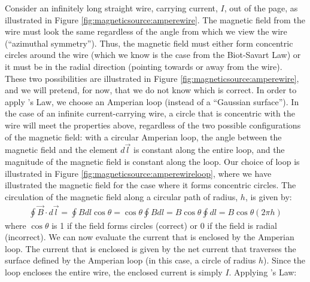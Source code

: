 Consider an infinitely long straight wire, carrying current, $I$, out of the page, as illustrated in Figure \ref{fig:magneticsource:amperewire}. The magnetic field from the wire must look the same regardless of the angle from which we view the wire (``azimuthal symmetry''). Thus, the magnetic field must either form concentric circles around the wire (which we know is the case from the Biot-Savart Law) or it must be in the radial direction (pointing towards or away from the wire). These two possibilities are illustrated in Figure \ref{fig:magneticsource:amperewire}, and we will pretend, for now, that we do not know which is correct.
In order to apply \ampere's Law, we choose an Amperian loop (instead of a ``Gaussian surface''). In the case of an infinite current-carrying wire, a circle that is concentric with the wire will meet the properties above, regardless of the two possible configurations of the magnetic field: with a circular Amperian loop, the angle between the magnetic field and the element $d\vec l$ is constant along the entire loop, and the magnitude of the magnetic field is constant along the loop. Our choice of loop is illustrated in Figure \ref{fig:magneticsource:amperewireloop}, where we have illustrated the magnetic field for the case where it forms concentric circles. 
The circulation of the magnetic field along a circular path of radius, $h$, is given by:
\begin{align*}
\oint  \vec B \cdot d\vec l = \oint B dl \cos\theta = \cos\theta \oint B dl=B\cos\theta \oint dl=B\cos\theta (2\pi h)
\end{align*}
where $\cos\theta$ is 1 if the field forms circles (correct) or 0 if the field is radial (incorrect). We can now evaluate the current that is enclosed by the Amperian loop. The current that is enclosed is given by the net current that traverses the surface defined by the Amperian loop (in this case, a circle of radius $h$). Since the loop encloses the entire wire, the enclosed current is simply $I$. Applying \ampere's Law:
